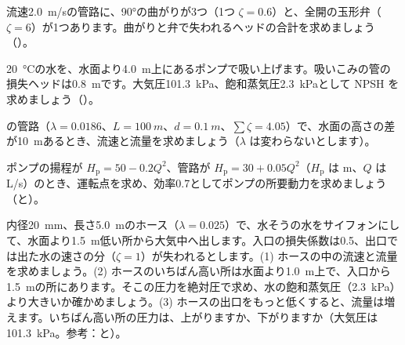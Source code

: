 \bkproblem 流速\qty{2.0}{m/s}の管路に、90°の曲がりが3つ（1つ $\zeta=0.6$）と、全開の玉形弁（$\zeta=6$）が1つあります。曲がりと弁で失われるヘッドの合計を求めましょう（\nobreak{}\nobreak）。

\bkproblem \qty{20}{\celsius}の水を、水面より\qty{4.0}{m}上にあるポンプで吸い上げます。吸いこみの管の損失ヘッドは\qty{0.8}{m}です。大気圧\qty{101.3}{kPa}、飽和蒸気圧\qty{2.3}{kPa}として NPSH を求めましょう（\nobreak{}\nobreak）。


\bkproblem {}の管路（$\lambda=0.0186$、$L=\qty{100}{m}$、$d=\qty{0.1}{m}$、$\sum\zeta=4.05$）で、水面の高さの差が\qty{10}{m}あるとき、流速と流量を求めましょう（$\lambda$ は変わらないとします）。

\bkproblem ポンプの揚程が $H_{\mathrm p}=50-0.2Q^2$、管路が $H_{\mathrm p}=30+0.05Q^2$（$H_{\mathrm p}$ は m、$Q$ は L/s）のとき、運転点を求め、効率0.7としてポンプの所要動力を求めましょう（\nobreak{}と\nobreak）。

\bkproblem 内径\qty{20}{mm}、長さ\qty{5.0}{m}のホース（$\lambda=0.025$）で、水そうの水をサイフォンにして、水面より\qty{1.5}{m}低い所から大気中へ出します。入口の損失係数は0.5、出口では出た水の速さの分（$\zeta=1$）が失われるとします。(1) ホースの中の流速と流量を求めましょう。(2) ホースのいちばん高い所は水面より\qty{1.0}{m}上で、入口から\qty{1.5}{m}の所にあります。そこの圧力を絶対圧で求め、水の飽和蒸気圧（\qty{2.3}{kPa}）より大きいか確かめましょう。(3) ホースの出口をもっと低くすると、流量は増えます。いちばん高い所の圧力は、上がりますか、下がりますか（大気圧は\qty{101.3}{kPa}。参考：と\nobreak）。

